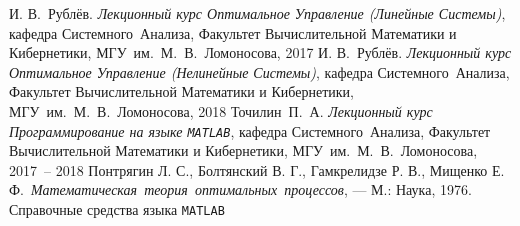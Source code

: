 \documentclass[11pt, oneside, final]{article}
\theoremstyle{break}
\numberwithin{equation}{section}
\theoremstyle{plain}
\theoremstyle{definition}
\begin{document}
    \begin{thebibliography}{0}
         И. В.~Рублёв. \emph{Лекционный курс Оптимальное Управление (Линейные Системы)},
        кафедра Системного~Анализа, Факультет Вычислительной Математики и Кибернетики, МГУ~им.~М.~В.~Ломоносова, 
        2017
         И. В.~Рублёв. \emph{Лекционный курс Оптимальное Управление (Нелинейные Системы)},
        кафедра Системного~Анализа, Факультет Вычислительной Математики и Кибернетики, МГУ~им.~М.~В.~Ломоносова, 
        2018
         Точилин~П.~А. \emph{Лекционный курс Программирование на языке \texttt{MATLAB}},
        кафедра Системного~Анализа, Факультет Вычислительной Математики и Кибернетики, МГУ~им.~М.~В.~Ломоносова, 
        2017~-- 2018
         Понтрягин Л. С., Болтянский В. Г., Гамкрелидзе Р. В., Мищенко Е. Ф.~\emph{Математическая~теория~оптимальных~процессов}, — М.: Наука, 1976.
         Справочные средства языка \texttt{MATLAB}
    \end{thebibliography}
\end{document}
